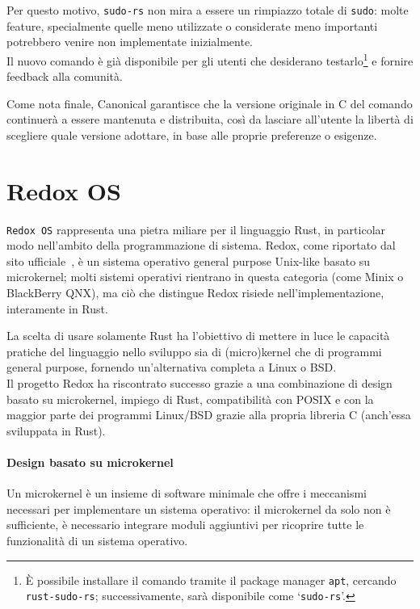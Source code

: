 Per questo motivo, \texttt{sudo-rs} non mira a essere un rimpiazzo totale di \texttt{sudo}: molte feature, specialmente quelle meno utilizzate o considerate meno importanti potrebbero venire non implementate inizialmente. \hfill
\vspace{7pt} \\
\noindent Il nuovo comando è già disponibile per gli utenti che desiderano testarlo\footnote{È possibile installare il comando tramite il package manager \texttt{apt}, cercando \texttt{rust-sudo-rs}; successivamente, sarà disponibile come `\texttt{sudo-rs}'.} e fornire feedback alla comunità.

Come nota finale, Canonical garantisce che la versione originale in C del comando continuerà a essere mantenuta e distribuita,
così da lasciare all'utente la libertà di scegliere quale versione adottare, in base alle proprie preferenze o esigenze.

\section{Redox OS}
\texttt{Redox OS} rappresenta una pietra miliare per il linguaggio Rust, in particolar modo nell'ambito della programmazione di sistema.
Redox, come riportato dal sito ufficiale~\cite{redox-os}, è un sistema operativo general purpose Unix-like basato su microkernel; molti sistemi operativi rientrano in questa categoria (come Minix o BlackBerry QNX),
ma ciò che distingue Redox risiede nell'implementazione, interamente in Rust. 

La scelta di usare solamente Rust ha l'obiettivo di mettere in luce le capacità pratiche del linguaggio 
nello sviluppo sia di (micro)kernel che di programmi general purpose, fornendo un'alternativa completa a Linux o BSD.\hfill
\vspace{7pt} \\
\noindent Il progetto Redox ha riscontrato successo grazie a una combinazione di design basato su microkernel,
impiego di Rust, compatibilità con POSIX e con la maggior parte dei programmi Linux/BSD grazie alla propria libreria C (anch'essa sviluppata in Rust).

\paragraph{Design basato su microkernel}
Un microkernel è un insieme di software minimale che offre i meccanismi necessari per implementare un sistema operativo: il microkernel da solo
non è sufficiente, è necessario integrare moduli aggiuntivi per ricoprire tutte le funzionalità di un sistema operativo.\ 


